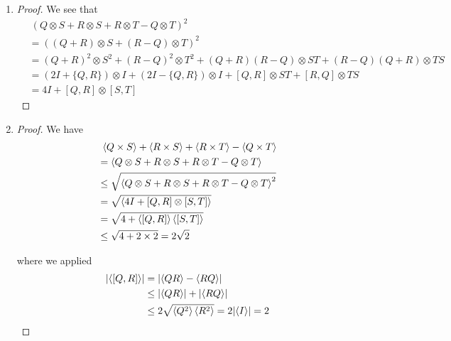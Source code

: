 \documentclass[../main.tex]{subfiles}
\begin{document}
\bigskip
\begin{problem}
\end{problem}
\begin{enumerate}
    \item
    \begin{proof}
    We see that
    \begin{align*}
        &\ (Q\otimes S+R\otimes S+R\otimes T-Q\otimes T)^2 \\
        &= ((Q+R)\otimes S+(R-Q)\otimes T)^2 \\ 
        &= (Q+R)^2\otimes S^2+(R-Q)^2\otimes T^2 + (Q+R)(R-Q)\otimes ST + (R-Q)(Q+R)\otimes TS \\
        &= (2I+\{Q,R\})\otimes I+(2I-\{Q,R\})\otimes I+[Q,R]\otimes ST+[R,Q]\otimes TS \\
        &= 4I + [Q,R]\otimes [S,T]
    \end{align*}
    \end{proof}
    
    \item
    \begin{proof}
    We have
    \begin{align*}
        &\ \braket{Q\times S}+\braket{R\times S}+\braket{R\times T}-\braket{Q\times T} \\
        &= \braket{Q\otimes S+R\otimes S+R\otimes T-Q\otimes T} \\
        &\leq \sqrt{\braket{Q\otimes S+R\otimes S+R\otimes T-Q\otimes T}^2} \\
        &= \sqrt{\braket{4I + [Q,R]\otimes [S,T]}} \\
        &= \sqrt{4 + \braket{[Q,R]}\braket{[S,T]}} \\
        &\leq \sqrt{4 + 2\times 2} = 2\sqrt{2}
    \end{align*}
    
    where we applied
    \begin{align*}
        \left\lvert\braket{[Q,R]}\right\rvert
        &= \lvert\braket{Q R} - \braket{R Q}\rvert \\
        &\leq \lvert\braket{Q R}\rvert + \lvert\braket{R Q}\rvert \\
        &\leq 2\sqrt{\braket{Q^2}\braket{R^2}} = 2\lvert\braket{I}\rvert = 2
    \end{align*}
    \end{proof}
\end{enumerate}
\end{document}
